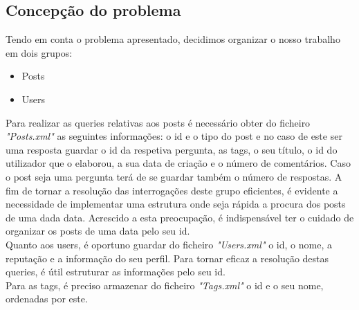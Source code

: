 \documentclass[10pt,a4paper]{article}
\begin{document}
\subsection{Concepção do problema}

Tendo em conta o problema apresentado, decidimos organizar o nosso trabalho em dois grupos:

\begin{itemize}
 \item Posts
 \item Users
\end{itemize}

Para realizar as queries relativas aos posts é necessário obter do ficheiro \textit{"Posts.xml"} as seguintes informações: o id e o tipo do post e no caso de este ser uma resposta guardar o id da respetiva pergunta, as tags, o seu título, o id do utilizador que o elaborou, a sua data de criação e o número de comentários. Caso o post seja uma pergunta terá de se guardar também o número de respostas. A fim de tornar a resolução das interrogações deste grupo eficientes, é evidente a necessidade de implementar uma estrutura onde seja rápida a procura dos posts de uma dada data. Acrescido a esta preocupação, é indispensável ter o cuidado de organizar os posts de uma data pelo seu id.\\
 \indent  Quanto aos users, é oportuno guardar do ficheiro \textit{"Users.xml"} o id, o nome, a reputação e a informação do seu perfil. Para tornar eficaz a resolução destas queries, é útil estruturar as informações pelo seu id.\\
 \indent Para as tags, é preciso armazenar do ficheiro \textit{"Tags.xml"} o id e o seu nome, ordenadas por este.
\end{document}
